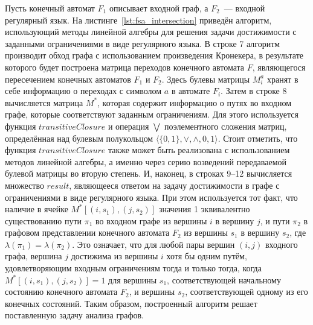Пусть конечный автомат $F_1$ описывает входной граф, а $F_2$~--- входной регулярный язык. На листинге~\ref{lst:fsa_intersection} приведён алгоритм, использующий методы линейной алгебры для решения задачи достижимости с заданными ограничениями в виде регулярного языка. В строке 7 алгоритм производит обход графа с использованием произведения Кронекера, в результате которого будет построена матрица переходов конечного автомата $F$, являющегося пересечением конечных автоматов $F_1$ и $F_2$. Здесь булевы матрицы $M_i^a$ хранят в себе информацию о переходах с символом $a$ в автомате $F_i$. Затем в строке 8 вычисляется матрица $M^*$, которая содержит информацию о путях во входном графе, которые соответствуют заданным ограничениям. Для этого используется функция $\textit{transitiveClosure}$ и операция $\bigvee$ поэлементного сложения матриц, определённая над булевым полукольцом $\langle \{0, 1\}, \vee, \wedge, 0, 1\rangle$. Стоит отметить, что функция $\textit{transitiveClosure}$ также может быть реализована с использованием методов линейной алгебры, а именно через серию возведений передаваемой булевой матрицы во вторую степень. И, наконец, в строках 9--12 вычисляется множество $\textit{result}$, являющееся ответом на задачу достижимости в графе с ограничениями в виде регулярного языка. При этом используется тот факт, что наличие в ячейке $M^*[(i, s_1), (j, s_2)]$ значения 1 эквивалентно существованию пути $\pi_1$ во входном графе из вершины $i$ в вершину $j$, и пути $\pi_2$ в графовом представлении конечного автомата $F_2$ из вершины $s_1$ в вершину $s_2$, где $\lambda(\pi_1) = \lambda(\pi_2)$. Это означает, что для любой пары вершин $(i, j)$ входного графа, вершина $j$ достижима из вершины $i$ хотя бы одним путём, удовлетворяющим входным ограничениям тогда и только тогда, когда $M^*[(i, s_1), (j, s_2)] = 1$ для вершины $s_1$, соответствующей начальному состоянию конечного автомата $F_2$, и вершины $s_2$, соответствующей одному из его конечных состояний. Таким образом, построенный алгоритм решает поставленную задачу анализа графов.


